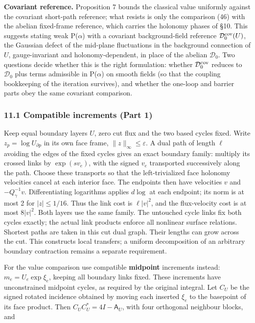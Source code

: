 \documentclass[11pt,a4paper]{article}
\begin{document}
\textbf{Covariant reference.} Proposition 7 bounds the classical value
uniformly against the covariant short-path reference; what resists is
only the comparison (46) with the abelian fixed-frame reference, which
carries the holonomy phases of §10. This suggests stating weak
P(\(\alpha\)) with a covariant background-field reference
\(\mathcal D_0^{\rm cov}(U)\), the Gaussian defect of the mid-plane
fluctuations in the background connection of \(U\), gauge-invariant and
holonomy-dependent, in place of the abelian \(\mathcal D_0\). Two
questions decide whether this is the right formulation: whether
\(\mathcal D_0^{\rm cov}\) reduces to \(\mathcal D_0\) plus terms
admissible in P(\(\alpha\)) on smooth fields (so that the coupling
bookkeeping of the iteration survives), and whether the one-loop and
barrier parts obey the same covariant comparison.

\hypertarget{compatible-increments-part-1}{%
\subsubsection{11.1 Compatible increments (Part
1)}\label{compatible-increments-part-1}}

Keep equal boundary layers \(U\), zero cut flux and the two based cycles
fixed. Write \(z_p=\log U_{\partial p}\) in its own face frame,
\(\|z\|_\infty\le\varepsilon\). A dual path of length \(\ell\) avoiding
the edges of the fixed cycles gives an exact boundary family: multiply
its crossed links by \(\exp(sv_e)\), with the signed \(v_e\) transported
successively along the path. Choose these transports so that the
left-trivialized face holonomy velocities cancel at each interior face.
The endpoints then have velocities \(v\) and \(-Q_\gamma^{-1}v\).
Differentiating logarithms applies \(d\log\) at each endpoint; its norm
is at most 2 for \(|z|\le1/16\). Thus the link cost is \(\ell|v|^2\),
and the flux-velocity cost is at most \(8|v|^2\). Both layers use the
same family. The untouched cycle links fix both cycles exactly; the
actual link products enforce all nonlinear surface relations. Shortest
paths are taken in this cut dual graph. Their lengths can grow across
the cut. This constructs local transfers; a uniform decomposition of an
arbitrary boundary contraction remains a separate requirement.

For the value comparison use compatible \textbf{midpoint} increments
instead: \(m_e=U_e\exp\xi_e\), keeping all boundary links fixed. These
increments have unconstrained midpoint cycles, as required by the
original integral. Let \(C_U\) be the signed rotated incidence obtained
by moving each inserted \(\xi_e\) to the basepoint of its face product.
Then \(C_UC_U^*=4I-\mathsf A_U\), with four orthogonal neighbour blocks,
and
\end{document}
